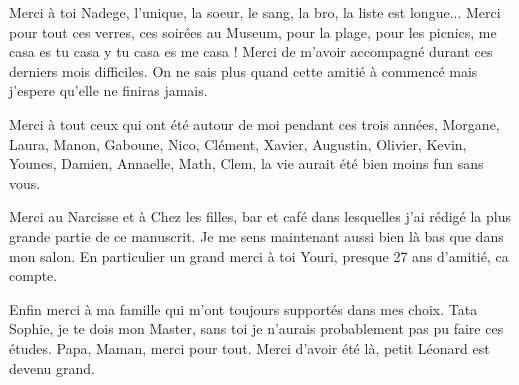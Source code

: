 \documentclass[../main.tex]{subfiles}
\begin{document}
Merci à toi Nadege, l'unique, la soeur, le sang, la bro, la liste est longue... Merci pour tout ces verres, ces soirées au Museum, pour la plage, pour les picnics, me casa es tu casa y tu casa es me casa ! Merci de m'avoir accompagné durant ces derniers mois difficiles. On ne sais plus quand cette amitié à commencé mais j'espere qu'elle ne finiras jamais.

Merci à tout ceux qui ont été autour de moi pendant ces trois années, Morgane, Laura, Manon, Gaboune, Nico, Clément, Xavier, Augustin, Olivier, Kevin, Younes, Damien, Annaelle, Math, Clem, la vie aurait été bien moins fun sans vous.

Merci au Narcisse et à Chez les filles, bar et café dans lesquelles j'ai rédigé la plus grande partie de ce manuscrit. Je me sens maintenant aussi bien là bas que dans mon salon. En particulier un grand merci à toi Youri, presque 27 ans d'amitié, ca compte.

Enfin merci à ma famille qui m'ont toujours supportés dans mes choix. Tata Sophie, je te dois mon Master, sans toi je n'aurais probablement pas pu faire ces études. Papa, Maman, merci pour tout. Merci d'avoir été là, petit Léonard est devenu grand.
\end{document}
